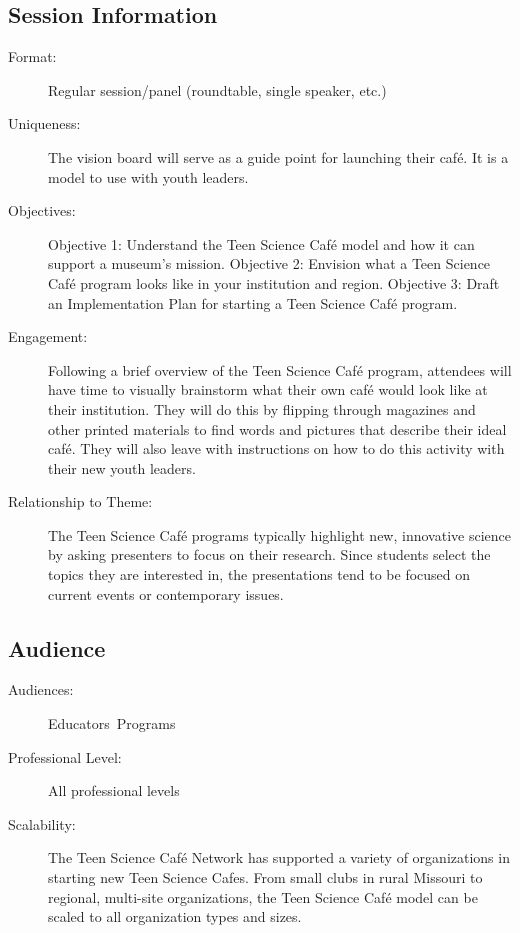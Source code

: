 \documentclass{report}
\begin{document}
              \subsection*{Session Information}
                \begin{description}
                  \item [Format:] Regular session/panel (roundtable, single speaker, etc.)
							    
							    \item [Uniqueness:]The vision board will serve as a guide point for launching their café. It is a model to use with youth leaders.
							    \item [Objectives:]Objective 1: Understand the Teen Science Café model and how it can support a museum’s mission.
Objective 2: Envision what a Teen Science Café program looks like in your institution and region.
Objective 3: Draft an Implementation Plan for starting a Teen Science Café program.
							    \item [Engagement:]Following a brief overview of the Teen Science Café program, attendees will have time to visually brainstorm what their own café would look like at their institution. They will do this by flipping through magazines and other printed materials to find words and pictures that describe their ideal café. They will also leave with instructions on how to do this activity with their new youth leaders.
							    \item [Relationship to Theme:]The Teen Science Café programs typically highlight new, innovative science by asking presenters to focus on their research. Since students select the topics they are interested in, the presentations tend to be focused on current events or contemporary issues.
							    
                \end{description}
              \subsection*{Audience}
                \begin{description}
                  \item [Audiences:]Educators~Programs~
                  \item[Professional Level:]All professional levels~
                \item[Scalability:] The Teen Science Café Network has supported a variety of organizations in starting new Teen Science Cafes. From small clubs in rural Missouri to regional, multi-site organizations, the Teen Science Café model can be scaled to all organization types and sizes. 

							
              \end{description}
\end{document}
